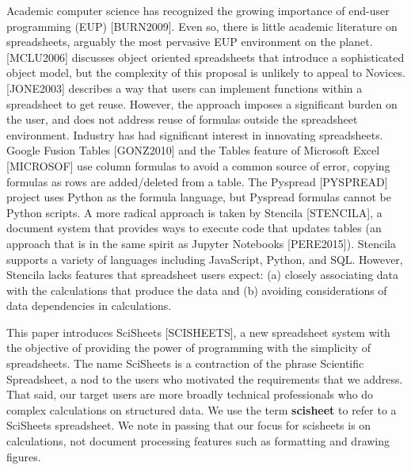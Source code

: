 \documentclass[letterpaper,compsoc,twoside]{IEEEtran}
\begin{document}
Academic computer science has recognized the growing importance
of end-user programming (EUP) {[}BURN2009{]}.
Even so,
there is little
academic literature on spreadsheets,
arguably the most pervasive EUP environment on the planet.
{[}MCLU2006{]} discusses object oriented spreadsheets that
introduce a sophisticated object model, but the complexity of
this proposal is unlikely to appeal to Novices.
{[}JONE2003{]} describes a way that users can implement functions
within a spreadsheet to get reuse.
However, the approach imposes a significant burden on the user,
and does not address reuse of
formulas outside the spreadsheet environment.
Industry has had significant
interest in innovating spreadsheets.
Google Fusion Tables {[}GONZ2010{]}
and the \textquotedbl{}Tables\textquotedbl{} feature of Microsoft Excel {[}MICROSOF{]}
use column formulas to avoid a common source of error,
copying formulas as rows are added/deleted from a table.
The Pyspread {[}PYSPREAD{]} project uses Python as the formula language,
but Pyspread formulas cannot be Python scripts.
A more radical approach is taken by
Stencila {[}STENCILA{]},
a document system that provides ways to execute code that
updates tables (an approach that is in the same
spirit as Jupyter Notebooks
{[}PERE2015{]}).
Stencila supports a variety of languages including
JavaScript, Python, and SQL.
However, Stencila lacks features that spreadsheet users expect:
(a) closely associating data with the calculations that produce the data
and (b) avoiding considerations of data dependencies in calculations.

This paper introduces SciSheets {[}SCISHEETS{]},
a new spreadsheet system with the
objective of providing
the power of programming with the simplicity of spreadsheets.
The name SciSheets is a contraction of the phrase \textquotedbl{}Scientific Spreadsheet\textquotedbl{}, a nod to the users
who motivated the requirements that we address.
That said,
our target users are more broadly technical professionals
who do complex calculations on structured data.
We use the term \textbf{scisheet} to refer to a SciSheets spreadsheet.
We note in passing that our focus for scisheets is on
calculations,
not document processing features such as formatting and drawing figures.
\end{document}

